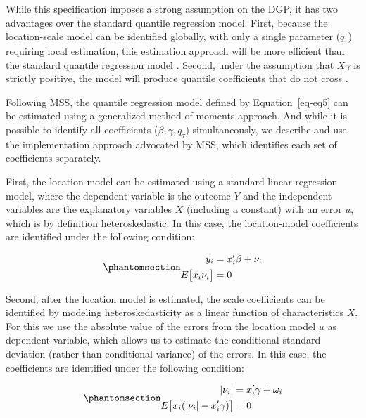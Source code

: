 \documentclass[
  12pt,
  oneside]{article}
\begin{document}
While this specification imposes a strong assumption on the DGP, it has
two advantages over the standard quantile regression model. First,
because the location-scale model can be identified globally, with only a
single parameter (\(q_\tau\)) requiring local estimation, this
estimation approach will be more efficient than the standard quantile
regression model \citep{zhao2000}. Second, under the assumption that
\(X\gamma\) is strictly positive, the model will produce quantile
coefficients that do not cross \citep{he1997}.

Following MSS, the quantile regression model defined by
Equation~\ref{eq-eq5} can be estimated using a generalized method of
moments approach. And while it is possible to identify all coefficients
(\(\beta,\gamma, q_\tau\)) simultaneously, we describe and use the
implementation approach advocated by MSS, which identifies each set of
coefficients separately.

First, the location model can be estimated using a standard linear
regression model, where the dependent variable is the outcome \(Y\) and
the independent variables are the explanatory variables \(X\) (including
a constant) with an error \(u\), which is by definition heteroskedastic.
In this case, the location-model coefficients are identified under the
following condition:

\begin{equation}\phantomsection\label{eq-eq7}{\begin{aligned}
      y_i &=x_i'\beta+\nu_i \\
      E\big[ x_i \nu_i\big] &=0
      \end{aligned}
}\end{equation}

Second, after the location model is estimated, the scale coefficients
can be identified by modeling heteroskedasticity as a linear function of
characteristics \(X\). For this we use the absolute value of the errors
from the location model \(u\) as dependent variable, which allows us to
estimate the conditional standard deviation (rather than conditional
variance) of the errors. In this case, the coefficients are identified
under the following condition:

\begin{equation}\phantomsection\label{eq-eq8}{\begin{aligned}
  |\nu_i| &=x_i'\gamma+\omega_i \\
   E\big[ x_i (|\nu_i| -x_i'\gamma ) \big] &=0
  \end{aligned}
}\end{equation}
\end{document}
